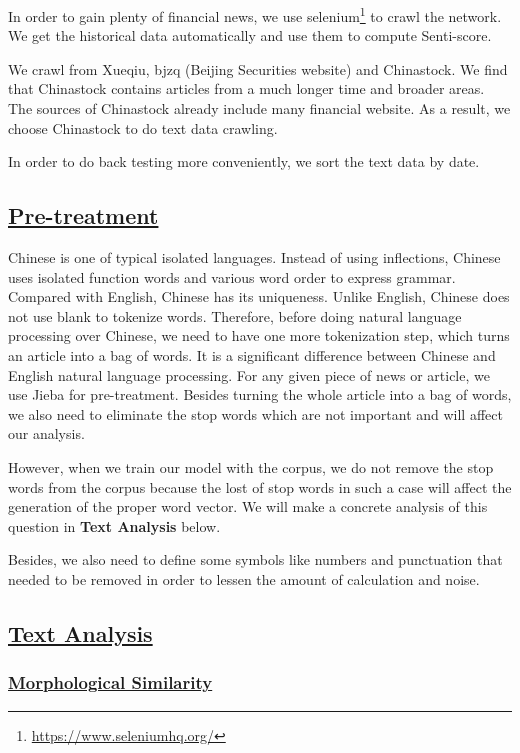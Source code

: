 \documentclass[10pt, conference, compsocconf]{IEEEtran}
\begin{document}
In order to gain plenty of financial news, we use selenium\footnote{\href{https://www.seleniumhq.org/}{https://www.seleniumhq.org/}} to crawl the network. We get the historical data automatically and use them to compute Senti-score.

We crawl from Xueqiu, bjzq (Beijing Securities website) and Chinastock. We find that Chinastock contains articles from a much longer time and broader areas. The sources of Chinastock already include many financial website. As a result, we choose Chinastock to do text data crawling.

In order to do back testing more conveniently, we sort the text data by date.

\subsection{\underline{Pre-treatment}}

Chinese is one of typical isolated languages. Instead of using inflections, Chinese uses isolated function words and various word order to express grammar. Compared with English, Chinese has its uniqueness. Unlike English, Chinese does not use blank to tokenize words. Therefore, before doing natural language processing over Chinese, we need to have one more tokenization step, which turns an article into a bag of words. It is a significant difference between Chinese and English natural language processing. For any given piece of news or article, we use Jieba for pre-treatment. Besides turning the whole article into a bag of words, we also need to eliminate the stop words which are not important and will affect our analysis.

However, when we train our model with the corpus, we do not remove the stop words from the corpus because the lost of stop words in such a case will affect the generation of the proper word vector. We will make a concrete analysis of this question in \textbf{Text Analysis} below.

Besides, we also need to define some symbols like numbers and punctuation that needed to be removed in order to lessen the amount of calculation and noise.

\subsection{\underline{Text Analysis}}
\subsubsection{\underline{Morphological Similarity}}
\end{document}
